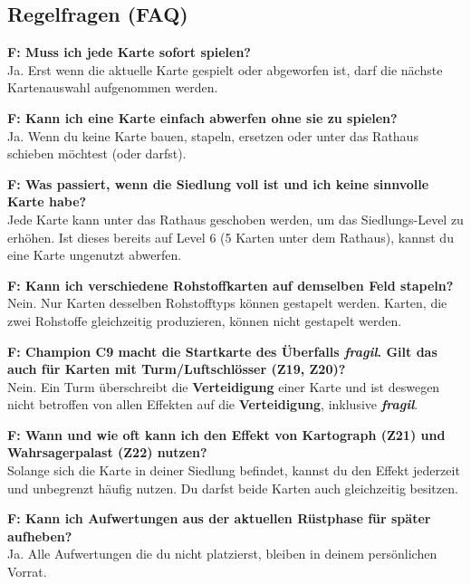 \documentclass[11pt]{article}
\begin{document}
\begin{lumenpage}
\par\vspace{24pt}

\lumenwideresume
\lumenfooteron

\chapter{Regelfragen (FAQ)}

{\scriptsize

\textbf{F: Muss ich jede Karte sofort spielen?}\\
Ja. Erst wenn die aktuelle Karte gespielt oder abgeworfen ist, darf die nächste Kartenauswahl aufgenommen werden.

\textbf{F: Kann ich eine Karte einfach abwerfen ohne sie zu spielen?}\\
Ja. Wenn du keine Karte bauen, stapeln, ersetzen oder unter das Rathaus schieben möchtest (oder darfst).

\textbf{F: Was passiert, wenn die Siedlung voll ist und ich keine sinnvolle Karte habe?}\\
Jede Karte kann unter das Rathaus geschoben werden, um das Siedlungs-Level zu erhöhen. Ist dieses bereits auf Level 6 (5 Karten unter dem Rathaus), kannst du eine Karte ungenutzt abwerfen.

\textbf{F: Kann ich verschiedene Rohstoffkarten auf demselben Feld stapeln?}\\
Nein. Nur Karten desselben Rohstofftyps können gestapelt werden. Karten, die zwei Rohstoffe gleichzeitig produzieren, können nicht gestapelt werden.

\textbf{F: Champion C9 macht die Startkarte des Überfalls \textcolor{LumenGold}{\textbf{\textit{fragil}}}. Gilt das auch für Karten mit Turm/Luftschlösser (Z19, Z20)?}\\
Nein. Ein Turm überschreibt die \lumenDef\textbf{ Verteidigung} einer Karte und ist deswegen nicht betroffen von allen Effekten auf die \lumenDef\textbf{ Verteidigung}, inklusive \textcolor{LumenGold}{\textbf{\textit{fragil}}}.

\textbf{F: Wann und wie oft kann ich den Effekt von Kartograph (Z21) und Wahrsagerpalast (Z22) nutzen?}\\
Solange sich die Karte in deiner Siedlung befindet, kannst du den Effekt jederzeit und unbegrenzt häufig nutzen. Du darfst beide Karten auch gleichzeitig besitzen.

\textbf{F: Kann ich Aufwertungen aus der aktuellen Rüstphase für später aufheben?}\\
Ja. Alle Aufwertungen die du nicht platzierst, bleiben in deinem persönlichen Vorrat.

}
\end{lumenpage}
\end{document}
